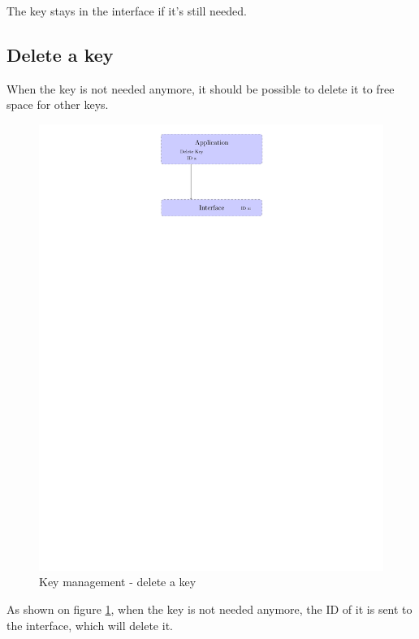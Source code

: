 The key stays in the interface if it's still needed.

\subsection*{Delete a key}
When the key is not needed anymore, it should be possible to delete it to free
space for other keys.

\begin{figure}[!ht]
\centering
\includegraphics[trim=12cm 22cm 11.5cm 0cm]{figures/key_manag_del_key.pdf}
\caption{Key management - delete a key}
\label{fig:gci_key_mng_del}
\end{figure}

As shown on figure \ref{fig:gci_key_mng_del}, when the key is not needed
anymore, the ID of it is sent to the interface, which will delete it.
